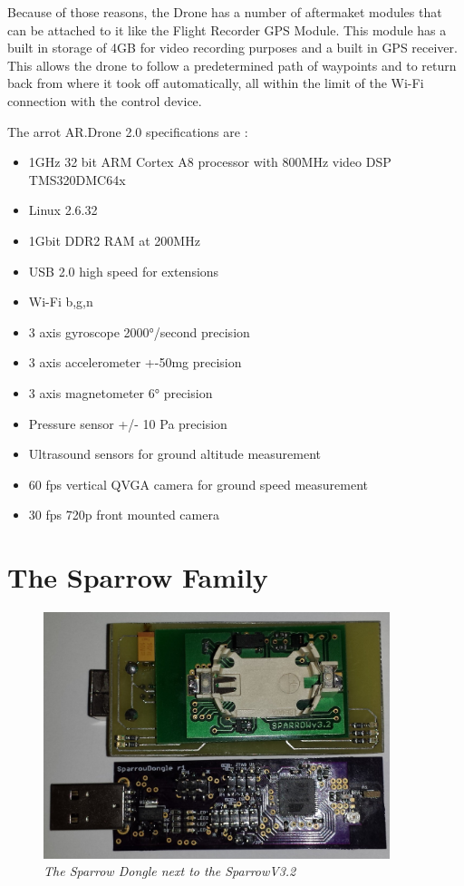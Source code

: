 Because of those reasons, the Drone has a number of aftermaket modules that can be attached to it like 
the Flight Recorder GPS Module. This module has a built in storage of 4GB for video recording purposes and a built in GPS receiver. This allows the drone to follow a predetermined path of waypoints and to return back from where it took off automatically, all within the limit of the Wi-Fi connection with the control device.
 

The arrot AR.Drone 2.0 specifications are :
\begin{itemize}



\item   1GHz 32 bit ARM Cortex A8 processor with 800MHz video DSP TMS320DMC64x
\item   Linux 2.6.32
\item   1Gbit DDR2 RAM at 200MHz
\item   USB 2.0 high speed for extensions
\item   Wi-Fi b,g,n
\item   3 axis gyroscope 2000°/second precision
\item   3 axis accelerometer +-50mg precision
\item   3 axis magnetometer 6° precision
\item   Pressure sensor +/- 10 Pa precision
\item   Ultrasound sensors for ground altitude measurement
\item   60 fps vertical QVGA camera for ground speed measurement
\item	30 fps 720p front mounted camera 	

\end{itemize}


\section{The Sparrow Family}

\begin{figure}[ht]
\begin{center}
\includegraphics[width=0.9\textwidth]{hw_platform/sparrow.jpg}
\end{center}
\caption{\small \itshape{The Sparrow Dongle next to the SparrowV3.2}}
\end{figure}
 
